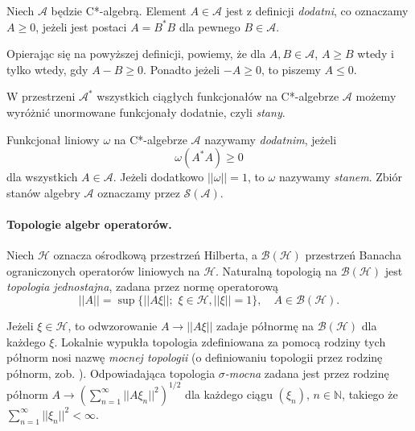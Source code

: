 \begin{Definition}
 Niech $\mathcal{A}$ będzie C*-algebrą. Element $A \in \mathcal{A}$ jest z
definicji \emph{dodatni}, co oznaczamy $A \geq 0$, jeżeli jest postaci
$A = B^{*}B$ dla pewnego $B \in \mathcal{A}$.
\end{Definition}

Opierając się na powyższej definicji, powiemy, że dla $A, B \in \mathcal{A}$,
$A \geq B$ wtedy i tylko wtedy, gdy $A-B \geq 0$. Ponadto jeżeli $-A
\geq 0$, to piszemy $A \leq 0$.

W przestrzeni $\mathcal{A}^{*}$ wszystkich ciągłych funkcjonałów na
C*-algebrze $\mathcal{A}$ możemy wyróżnić unormowane funkcjonały dodatnie,
czyli \emph{stany}.

\begin{Definition}
 \label{def:stateOnCalg}
  Funkcjonał liniowy $\omega$ na C*-algebrze $\mathcal{A}$ nazywamy
\emph{dodatnim}, jeżeli
\begin{equation}
 \label{eq:stateOnCalg}
  \omega(A^{*}A) \geq 0
\end{equation}
dla wszystkich $A \in \mathcal{A}$.
Jeżeli dodatkowo $||\omega|| = 1$, to $\omega$ nazywamy \emph{stanem}.
Zbiór stanów algebry $\mathcal{A}$ oznaczamy przez $\mathcal{S}(\mathcal{A})$.
\end{Definition}

\paragraph{Topologie algebr operatorów.}
Niech $\mathcal{H}$ oznacza ośrodkową przestrzeń Hilberta, a $\mathcal{B}(\mathcal{H})$ przestrzeń
Banacha ograniczonych operatorów liniowych na $\mathcal{H}$.
Naturalną topologią na $\mathcal{B}(\mathcal{H})$ jest \emph{topologia jednostajna}, zadana
przez normę operatorową
\begin{equation}
 \label{eq:operatorNorm}
  ||A|| = %
  \sup \{ ||A\xi||; \, \, \xi \in \mathcal{H}, %
	    ||\xi|| = 1 \}, \quad A \in \mathcal{B}(\mathcal{H}).
\end{equation}

Jeżeli $\xi \in \mathcal{H}$,
to odwzorowanie $A \rightarrow ||A\xi||$ zadaje
półnormę na $\mathcal{B}(\mathcal{H})$ dla każdego $\xi$.
Lokalnie wypukła topologia zdefiniowana za
pomocą rodziny tych półnorm nosi nazwę \emph{mocnej topologii}
(o definiowaniu
topologii przez rodzinę półnorm, zob. \cite{Rudin1991}).
Odpowiadająca topologia \emph{$\sigma$-mocna} zadana jest przez
rodzinę półnorm
$A \rightarrow \left( \sum \limits_{n=1}^{\infty} ||A \xi_{n}||^{2} \right)^{1/2}$
dla każdego ciągu $(\xi_{n})$,
$n \in \mathbb{N}$, takiego że
$\sum \limits_{n=1}^{\infty} ||\xi_{n}||^{2} < \infty$.

